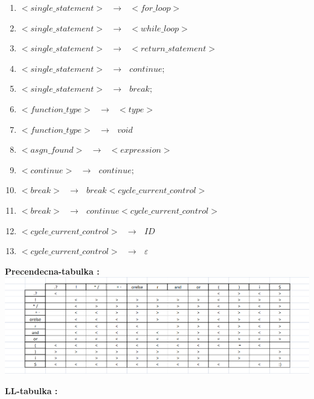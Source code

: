 \documentclass[12pt]{article}
\begin{document}
\begin{enumerate}
\item $ <single\_statement> \text{ }\to \text{ } <for\_loop>$
\item $<single\_statement> \text{ }\to \text{ } <while\_loop>$
\item $<single\_statement> \text{ }\to \text{ } <return\_statement>$
\item $<single\_statement> \text{ }\to \text{ }  continue ;$
\item $<single\_statement> \text{ }\to \text{ }  break ;$
\item $<function\_type> \text{ }\to \text{ } <type>$
\item $<function\_type> \text{ }\to \text{ } void$
\item $<asgn\_found> \text{ }\to \text{ } <expression> $
\item $<continue> \text{ }\to \text{ } continue ;$
\item $<break> \text{ }\to \text{ } break <cycle\_current\_control>$
\item $<break> \text{ }\to \text{ } continue <cycle\_current\_control>$
\item $<cycle\_current\_control> \text{ }\to \text{ } ID$
\item $<cycle\_current\_control> \text{ }\to \text{ } \varepsilon$

\end{enumerate}

\Large \textbf{Precendecna-tabulka :}
\newline \\

\includegraphics[width=\textwidth,scale=0.3]{Ptabulka}

\newpage

 \Large \textbf{LL-tabulka :}
\newline \\
\end{document}
